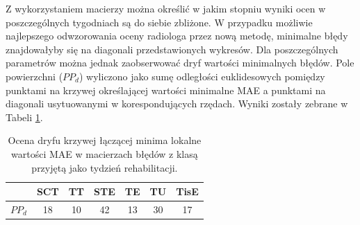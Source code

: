 Z wykorzystaniem macierzy można określić w jakim stopniu wyniki ocen w poszczególnych tygodniach są do siebie zbliżone. \linebreak W przypadku możliwie najlepszego odwzorowania oceny radiologa przez nową metodę, minimalne błędy znajdowałyby się na diagonali przedstawionych wykresów. Dla poszczególnych parametrów można jednak zaobserwować dryf wartości minimalnych błędów. Pole powierzchni ($PP_d$) wyliczono jako sumę odległości euklidesowych pomiędzy punktami na krzywej określającej wartości minimalne MAE a punktami na diagonali usytuowanymi w korespondujących rzędach. Wyniki zostały zebrane w Tabeli \ref{tab:dryf_meas}. 
\vspace{10px} 
\begin{table}[h!]
	\caption{Ocena dryfu krzywej łączącej minima lokalne wartości MAE w macierzach błędów z klasą przyjętą jako tydzień rehabilitacji.}
	\begin{center}
		\begin{tabular}{l||c|c|c|c|c|c}
		
			& \textbf{SCT} & \textbf{TT} & \textbf{STE} & \textbf{TE} & \textbf{TU} & \textbf{TisE}\\ 
			\hline \hline
			$PP_d$ &18&10&42&13&30&17\\	
					
		\end{tabular}
	\end{center}
	\label{tab:dryf_meas}
\end{table}

